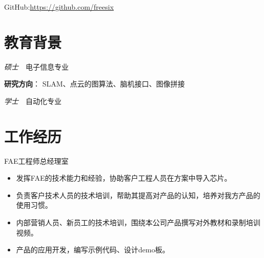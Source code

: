 \documentclass{resume}
\begin{document}


{\centerline{}}
{\centerline{GitHub:\hyperlink{https://github.com/freesix}{https://github.com/freesix}}}




\section{\textcolor[RGB]{50,50,190}{\faGraduationCap 教育背景}}

\textit{硕士}\ \ 电子信息专业

\textcolor[RGB]{80,100,190}{\textbf{研究方向}}：
SLAM、点云的图算法、脑机接口、图像拼接


\textit{学士}\ \ 自动化专业

\section{\textcolor[RGB]{50,50,190}{\faBriefcase 工作经历}}

FAE工程师\qquad 总经理室
\begin{itemize}
  \item 发挥FAE的技术能力和经验，协助客户工程人员在方案中导入芯片。
  \item 负责客户技术人员的技术培训，帮助其提高对产品的认知，培养对我方产品的使用习惯。
  \item 内部营销人员、新员工的技术培训，围绕本公司产品撰写对外教材和录制培训视频。
  \item 产品的应用开发，编写示例代码、设计demo板。
\end{itemize}
\end{document}
